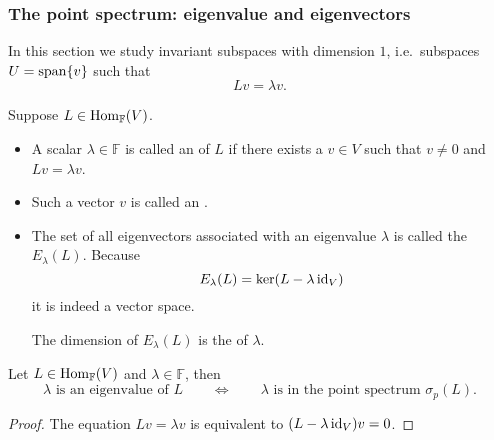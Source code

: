 \subsubsection{The point spectrum: eigenvalue and eigenvectors}
In this section we study invariant subspaces with dimension $1$, i.e.\ subspaces $U= \operatorname{span}\{v\}$ such that
\[ Lv = \lambda v. \]
\begin{definition}
Suppose $L\in \operatorname{Hom}_{\mathbb{F}}(V)$.
\begin{itemize}
\item  A scalar $\lambda\in \mathbb{F}$ is called an  of $L$ if there exists a $v\in V$ such that $v\neq 0$ and $Lv = \lambda v$.
\item Such a vector $v$ is called an .
\item The set of all eigenvectors associated with an eigenvalue $\lambda$ is called the  $E_\lambda(L)$. Because
\[ E_\lambda(L) = \ker(L-\lambda \operatorname{id}_V) \]
it is indeed a vector space.

The dimension of $E_\lambda(L)$ is the  of $\lambda$.
\end{itemize}
\end{definition}
\begin{proposition}
Let $L\in \operatorname{Hom}_\mathbb{F}(V)$ and $\lambda\in \mathbb{F}$, then
\[ \text{$\lambda$ is an eigenvalue of $L$} \qquad \iff \qquad \text{$\lambda$ is in the point spectrum $\sigma_p(L)$.} \]
\end{proposition}
\begin{proof}
The equation $Lv = \lambda v$ is equivalent to $(L-\lambda \operatorname{id}_V)v = 0$.
\end{proof}

